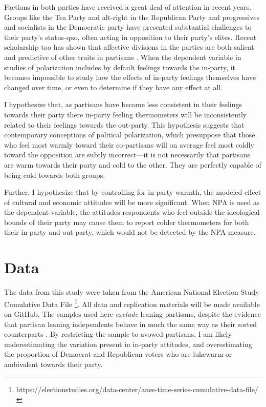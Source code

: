 \documentclass[12pt]{article}
\begin{document}
Factions in both parties have received a great deal of attention in recent years. Groups like the Tea Party and alt-right in the Republican Party and progressives and socialists in the Democratic party have presented substantial challenges to their party's status-quo, often acting in opposition to their party's elites. Recent scholarship too has shown that affective divisions in the parties are both salient and predictive of other traits in partisans \citep{wronski2018tale, bankert2020authoritarian}. When the dependent variable in studies of polarization includes by default feelings towards the in-party, it becomes impossible to study how the effects of in-party feelings themselves have changed over time, or even to determine if they have any effect at all.


I hypothesize that, as partisans have become less consistent in their feelings towards their party there in-party feeling thermometers will be inconsistently related to their feelings towards the out-party. This hypothesis suggests that contemporary conceptions of political polarization, which presuppose that those who feel most warmly toward their co-partisans will  on average feel most coldly toward the opposition are subtly incorrect---it is not necessarily that partisans are warm towards their party and cold to the other. They are perfectly capable of being cold towards both groups. 

Further, I hypothesize that by controlling for in-party warmth, the modeled effect of cultural and economic attitudes will be more significant. When NPA is used as the dependent variable, the attitudes respondents who feel outside the ideological bounds of their party may cause them to report colder thermometers for both their in-party and out-party, which would not be detected by the NPA measure.

\section{Data}

The data from this study were taken from the American National Election Study Cumulative Data File \footnote{https://electionstudies.org/data-center/anes-time-series-cumulative-data-file/}. All data and replication materials will be made available on GitHub. The samples used here \textit{exclude} leaning partisans, despite the evidence that partisan leaning independents behave in much the same way as their sorted counterparts \citep{klar2016independent}. By restricting the sample to avowed partisans, I am likely underestimating the variation present in in-party attitudes, and overestimating the proportion of Democrat and Republican voters who are lukewarm or ambivalent towards their party. 
\end{document}

